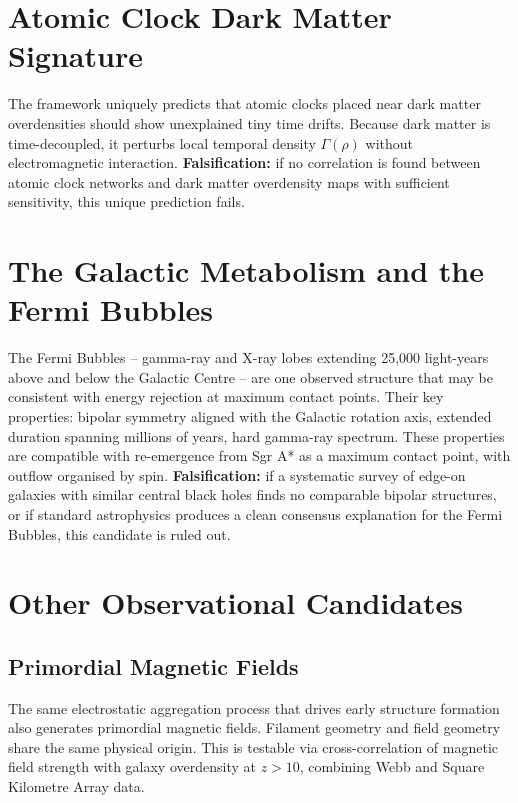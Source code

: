\documentclass[11pt,a4paper]{article}
\begin{document}
\section{Atomic Clock Dark Matter Signature}
The framework uniquely predicts that atomic clocks placed near dark matter overdensities should show unexplained tiny time drifts. Because dark matter is time-decoupled, it perturbs local temporal density $\Gamma(\rho)$ without electromagnetic interaction. \textbf{Falsification:} if no correlation is found between atomic clock networks and dark matter overdensity maps with sufficient sensitivity, this unique prediction fails.

\section{The Galactic Metabolism and the Fermi Bubbles}
The Fermi Bubbles -- gamma-ray and X-ray lobes extending 25,000 light-years above and below the Galactic Centre -- are one observed structure that may be consistent with energy rejection at maximum contact points. Their key properties: bipolar symmetry aligned with the Galactic rotation axis, extended duration spanning millions of years, hard gamma-ray spectrum. These properties are compatible with re-emergence from Sgr A* as a maximum contact point, with outflow organised by spin. \textbf{Falsification:} if a systematic survey of edge-on galaxies with similar central black holes finds no comparable bipolar structures, or if standard astrophysics produces a clean consensus explanation for the Fermi Bubbles, this candidate is ruled out.

\section{Other Observational Candidates}
\subsection{Primordial Magnetic Fields}
The same electrostatic aggregation process that drives early structure formation also generates primordial magnetic fields. Filament geometry and field geometry share the same physical origin. This is testable via cross-correlation of magnetic field strength with galaxy overdensity at $z > 10$, combining Webb and Square Kilometre Array data.
\end{document}
